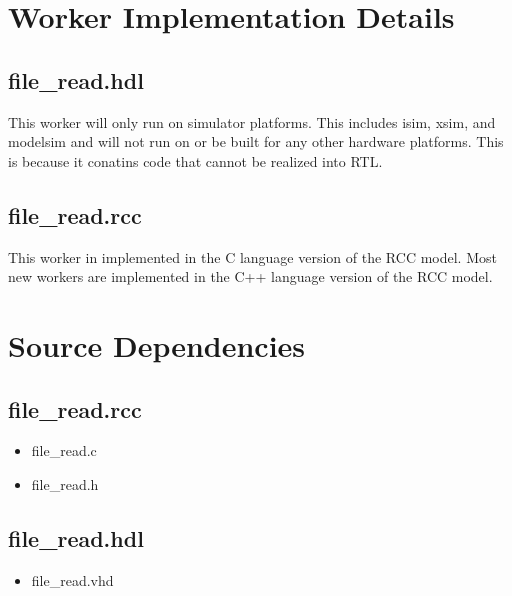 \documentclass{article}
\def\comp{file\_read}
\begin{document}
\section*{Worker Implementation Details}
\subsection*{\comp.hdl}
\begin{flushleft}
This worker will only run on simulator platforms.  This includes isim, xsim, and modelsim and will not run on or be built for any other hardware platforms.  This is because it conatins code that cannot be realized into RTL.
\end{flushleft}
\subsection*{\comp.rcc}
\begin{flushleft}
This worker in implemented in the C language version of the RCC model.  Most new workers are implemented in the C++ language version of the RCC model.
\end{flushleft}

\section*{Source Dependencies}
\subsection*{\comp.rcc}
\begin{itemize}
\item file\_read.c
\item file\_read.h
\end{itemize}
\subsection*{\comp.hdl}
\begin{itemize}
\item file\_read.vhd
\end{itemize}
\end{document}
